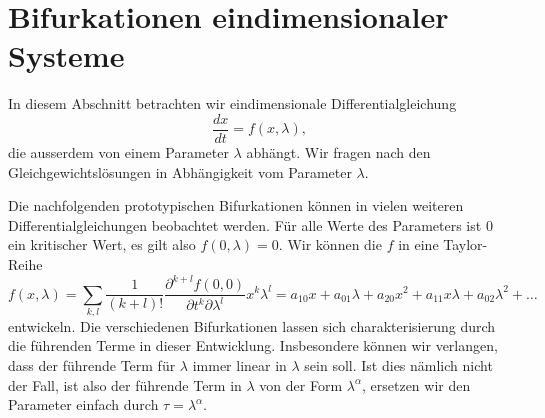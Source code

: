 \section{Bifurkationen eindimensionaler Systeme}
In diesem Abschnitt betrachten wir eindimensionale Differentialgleichung
\begin{equation}
\frac{dx}{dt} = f(x,\lambda),
\end{equation}
die ausserdem von einem Parameter $\lambda$ abhängt.
Wir fragen nach den Gleichgewichtslösungen in Abhängigkeit vom
Parameter $\lambda$.

Die nachfolgenden prototypischen Bifurkationen können in vielen
weiteren Differentialgleichungen beobachtet werden. 
Für alle Werte des Parameters ist $0$ ein kritischer Wert,
es gilt also $f(0,\lambda)=0$.
Wir können die $f$ in eine Taylor-Reihe 
\begin{equation}
f(x,\lambda)
=
\sum_{k,l} \frac{1}{(k+l)!}\frac{\partial^{k+l} f(0,0)}{\partial t^k\partial\lambda^l} x^k\lambda^l
=
a_{10}x + a_{01}\lambda
+
a_{20}x^2 + a_{11}x\lambda + a_{02}\lambda^2 + \dots
\end{equation}
entwickeln.
Die verschiedenen Bifurkationen lassen sich charakterisierung durch
die führenden Terme in dieser Entwicklung.
Insbesondere können wir verlangen, dass der führende Term für $\lambda$
immer linear in $\lambda$ sein soll.
Ist dies nämlich nicht der Fall, ist also der führende Term in 
$\lambda$ von der Form $\lambda^\alpha$, ersetzen wir den
Parameter einfach durch $\tau=\lambda^\alpha$.

